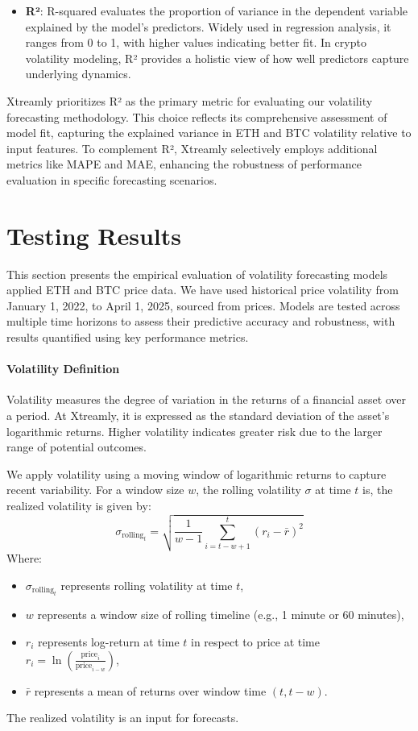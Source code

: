 \documentclass[9pt]{article}
\begin{document}
\begin{multicols}{2}
\begin{itemize}
			\item \textbf{R²}: R-squared evaluates the proportion of variance in the dependent variable explained by the model’s predictors. Widely used in regression analysis, it ranges from 0 to 1, with higher values indicating better fit. In crypto volatility modeling, R² provides a holistic view of how well predictors capture underlying dynamics.
		\end{itemize}
		Xtreamly prioritizes R² as the primary metric for evaluating our volatility forecasting methodology. This choice reflects its comprehensive assessment of model fit, capturing the explained variance in ETH and BTC volatility relative to input features. To complement R², Xtreamly selectively employs additional metrics like MAPE and MAE, enhancing the robustness of performance evaluation in specific forecasting scenarios.
					
		\section{Testing Results}
		
		This section presents the empirical evaluation of volatility forecasting models applied ETH and BTC price data. We have used historical price volatility from January 1, 2022, to April 1, 2025, sourced from prices. Models are tested across multiple time horizons to assess their predictive accuracy and robustness, with results quantified using key performance metrics.
		
		\paragraph{Volatility Definition}
		Volatility measures the degree of variation in the returns of a financial asset over a period. At Xtreamly, it is expressed as the standard deviation of the asset's logarithmic returns. Higher volatility indicates greater risk due to the larger range of potential outcomes.
		
		\smallskip
		We apply volatility using a moving window of logarithmic returns to capture recent variability. For a window size $w$, the rolling volatility $\sigma$ at time $t$ is, the realized volatility is given by:
		\[
		\sigma_{\text{rolling}_t} = \sqrt{\frac{1}{w-1} \sum_{i=t-w+1}^{t} (r_i - \bar{r})^2}
		\]
		Where:
		\begin{itemize}
			\item $\sigma_{\text{rolling}_t}$ represents rolling volatility at time $t$,
			\item $w$ represents a window size of rolling timeline (e.g., 1 minute or 60 minutes),
			\item $r_i$ represents log-return at time $t$ in respect to price at time $r_i = \ln\left(\frac{\text{price}_i}{\text{price}_{i-w}}\right)$,
			\item $\bar{r}$ represents a mean of returns over window time $(t, t-w)$.
		\end{itemize}
		The realized volatility is an input for forecasts.
		

\end{multicols}
\end{document}
